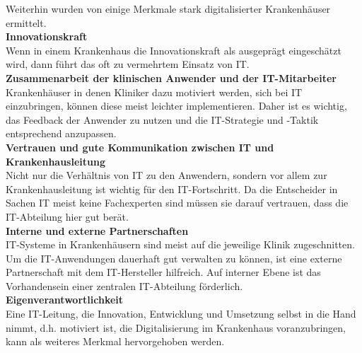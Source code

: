 Weiterhin wurden von \cite{huebner2019} einige Merkmale stark digitalisierter Krankenhäuser ermittelt.
\vspace{\parheadvspace}\\
\textbf{Innovationskraft}\\
Wenn in einem Krankenhaus die Innovationskraft als ausgeprägt eingeschätzt wird, dann führt das oft zu vermehrtem Einsatz von IT. 
\vspace{\parheadvspace}\\
\textbf{Zusammenarbeit der klinischen Anwender und der IT-Mitarbeiter}\\
Krankenhäuser in denen Kliniker dazu motiviert werden, sich bei IT einzubringen, können diese meist leichter implementieren. Daher ist es wichtig, das Feedback der Anwender zu nutzen und die IT-Strategie und -Taktik entsprechend anzupassen.
\vspace{\parheadvspace}\\
\textbf{Vertrauen und gute Kommunikation zwischen IT und Krankenhausleitung}\\
Nicht nur die Verhältnis von IT zu den Anwendern, sondern vor allem zur Krankenhausleitung ist wichtig für den IT-Fortschritt. Da die Entscheider in Sachen IT meist keine Fachexperten sind müssen sie darauf vertrauen, dass die IT-Abteilung hier gut berät.
\vspace{\parheadvspace}\\
\textbf{Interne und externe Partnerschaften}\\
IT-Systeme in Krankenhäusern sind meist auf die jeweilige Klinik zugeschnitten. Um die IT-Anwendungen dauerhaft gut verwalten zu können, ist eine externe Partnerschaft mit dem IT-Hersteller hilfreich. Auf interner Ebene ist das Vorhandensein einer zentralen IT-Abteilung förderlich.
\vspace{\parheadvspace}\\
\textbf{Eigenverantwortlichkeit}\\
Eine IT-Leitung, die Innovation, Entwicklung und Umsetzung selbst in die Hand nimmt, d.h. motiviert ist, die Digitalisierung im Krankenhaus voranzubringen, kann als weiteres Merkmal hervorgehoben werden.
